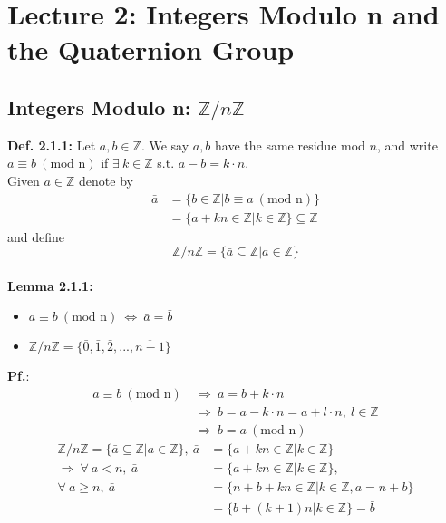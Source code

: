 \documentclass{article}
\begin{document}
\section{Lecture 2: Integers Modulo n and the Quaternion Group}
\subsection{Integers Modulo n: $\mathbb{Z}/n\mathbb{Z}$}
\textbf{Def. 2.1.1:} Let $a,b\in \mathbb{Z}$. We say $a,b$ have the same residue mod $n$, and write $a\equiv b~(\text{mod n})$ if $\exists~k\in \mathbb{Z}$ s.t. $a-b=k\cdot n$.\\

Given $a\in \mathbb{Z}$ denote by 
\begin{align*}
\bar{a}&=\lbrace b\in \mathbb{Z}|b\equiv a~ (\text{mod n})\rbrace	\\
&=\lbrace a + kn \in \mathbb{Z}| k\in \mathbb{Z}\rbrace \subseteq \mathbb{Z}
\end{align*}
and define 
\begin{equation}
\mathbb{Z}/n\mathbb{Z}=\lbrace \bar{a} \subseteq \mathbb{Z}|a\in \mathbb{Z}\rbrace
\end{equation}
\vspace{2mm}~\\
\textbf{Lemma 2.1.1:}
\begin{itemize}
\item $a\equiv b ~(\text{mod n}) ~\Leftrightarrow ~\bar{a}=\bar{b}$
\item $\mathbb{Z}/n\mathbb{Z} = \lbrace\bar{0}, \bar{1}, \bar{2}, ..., \overline{n-1}\rbrace $
\end{itemize}
\textbf{Pf.}:
\begin{align*}
a\equiv b~(\text{mod n})~&\Rightarrow ~ a= b + k\cdot n\\
&\Rightarrow ~ b = a - k\cdot n = a + l\cdot n ,~ l\in \mathbb{Z}\\
&\Rightarrow ~ b=a~(\text{mod n})
\end{align*}
\begin{align*}
\mathbb{Z}/n\mathbb{Z}=\lbrace \bar{a}\subseteq \mathbb{Z}|a\in \mathbb{Z}\rbrace,~ \bar{a}&=\lbrace a + kn \in \mathbb{Z}| k\in \mathbb{Z}\rbrace\\
\Rightarrow ~\forall~a<n, ~ \bar{a} &=\lbrace a + kn \in \mathbb{Z}| k\in \mathbb{Z}\rbrace,\\ \forall ~ a\geq n,~\bar{a}&=\lbrace n+b +kn\in \mathbb{Z}|k\in\mathbb{Z}, a=n+b\rbrace\\
&=\lbrace b+(k+1)n|k\in\mathbb{Z}\rbrace=\bar{b}
\end{align*}
\end{document}

